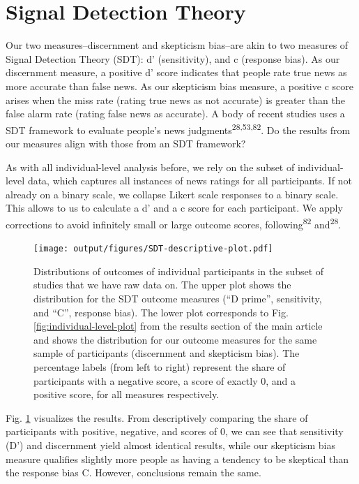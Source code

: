 \documentclass[
  man]{apa6}
\begin{document}
\section{Signal Detection Theory}\label{signal-detection-theory}

Our two measures--discernment and skepticism bias--are akin to two measures of Signal Detection Theory (SDT): d' (sensitivity), and c (response bias). As our discernment measure, a positive d' score indicates that people rate true news as more accurate than false news. As our skepticism bias measure, a positive c score arises when the miss rate (rating true news as not accurate) is greater than the false alarm rate (rating false news as accurate). A body of recent studies uses a SDT framework to evaluate people's news judgments\textsuperscript{28,53,82}. Do the results from our measures align with those from an SDT framework?

As with all individual-level analysis before, we rely on the subset of individual-level data, which captures all instances of news ratings for all participants. If not already on a binary scale, we collapse Likert scale responses to a binary scale. This allows to us to calculate a d' and a c score for each participant. We apply corrections to avoid infinitely small or large outcome scores, following\textsuperscript{82} and\textsuperscript{28}.



\begin{figure}
\centering
\texttt{[image: output/figures/SDT-descriptive-plot.pdf]}
\caption{\label{fig:SDT-descriptive-plot}Distributions of outcomes of individual participants in the subset of studies that we have raw data on. The upper plot shows the distribution for the SDT outcome measures (``D prime'', sensitivity, and ``C'', response bias). The lower plot corresponds to Fig. \ref{fig:individual-level-plot} from the results section of the main article and shows the distribution for our outcome measures for the same sample of participants (discernment and skepticism bias). The percentage labels (from left to right) represent the share of participants with a negative score, a score of exactly 0, and a positive score, for all measures respectively.}
\end{figure}

Fig. \ref{fig:SDT-descriptive-plot} visualizes the results. From descriptively comparing the share of participants with positive, negative, and scores of 0, we can see that sensitivity (D') and discernment yield almost identical results, while our skepticism bias measure qualifies slightly more people as having a tendency to be skeptical than the response bias C. However, conclusions remain the same.
\end{document}
